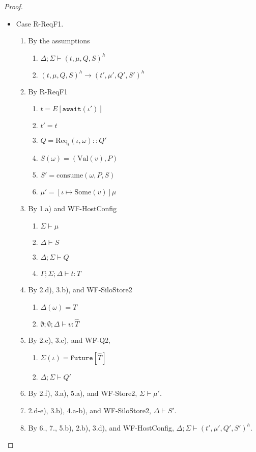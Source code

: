 \documentclass{article}
\theoremstyle{definition}
\newcommand{\ReqF}[2]{\text{Req}_{\iota}(#1, #2)}
\newcommand{\Val}[1]{\text{Val}(#1)}
\newcommand{\consume}[3]{\text{consume}(#1, #2, #3)}
\begin{document}
\begin{proof}
\begin{itemize}
\item Case R-ReqF1.
\begin{enumerate}
\item By the assumptions
  \begin{enumerate}[label=(\alph*)]
  \item $\Delta ; \Sigma \vdash (t, \mu, Q, S)^h$
  \item $(t, \mu, Q, S)^h \longrightarrow (t', \mu', Q', S')^h$
  \end{enumerate}
\item By R-ReqF1
  \begin{enumerate}[label=(\alph*)]
  \item $t = E[\texttt{await}(\iota')]$
  \item $t' = t$
  \item $Q = {\ReqF \iota \omega} :: Q'$
  \item $S(\omega) = (\Val{v}, P)$
  \item $S' = {\consume \omega P S}$
  \item $\mu' = [\iota \mapsto \text{Some}(v)]\mu$
  \end{enumerate}
\item By 1.a) and WF-HostConfig
  \begin{enumerate}[label=(\alph*)]
  \item $\Sigma \vdash \mu$
  \item $\Delta \vdash S$
  \item $\Delta ; \Sigma \vdash Q$
  \item $\Gamma ; \Sigma ; \Delta \vdash t : T$
  \end{enumerate}
\item By 2.d), 3.b), and WF-SiloStore2
  \begin{enumerate}[label=(\alph*)]
  \item $\Delta(\omega) = \hat{T}$
  \item $\emptyset ; \emptyset ; \Delta \vdash v : \hat{T}$
  \end{enumerate}
\item By 2.c), 3.c), and WF-Q2,
  \begin{enumerate}[label=(\alph*)]
  \item $\Sigma(\iota) = \texttt{Future}[\hat{T}]$
  \item $\Delta ; \Sigma \vdash Q'$
  \end{enumerate}
\item By 2.f), 3.a), 5.a), and WF-Store2, $\Sigma \vdash \mu'$.
\item 2.d-e), 3.b), 4.a-b), and WF-SiloStore2, $\Delta \vdash S'$.
\item By 6., 7., 5.b), 2.b), 3.d), and WF-HostConfig, $\Delta ; \Sigma \vdash (t', \mu', Q', S')^h$.
\end{enumerate}


\end{itemize}
\end{proof}
\end{document}
